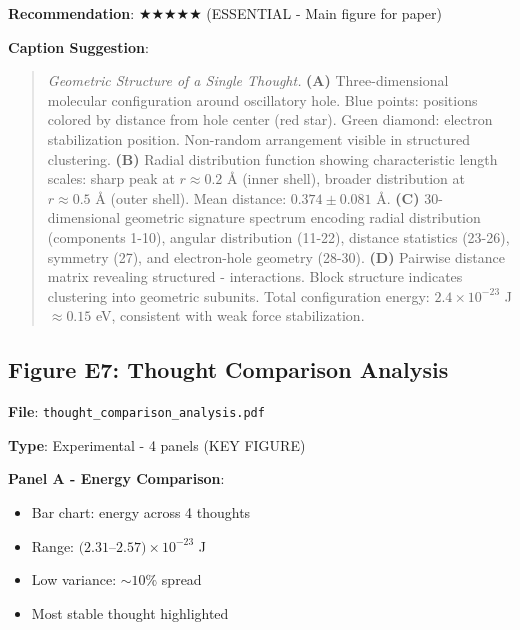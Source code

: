 \documentclass[11pt]{article}
\begin{document}
\textbf{Recommendation}: $\bigstar\bigstar\bigstar\bigstar\bigstar$ (ESSENTIAL - Main figure for paper)

\textbf{Caption Suggestion}:
\begin{quote}
\textit{Geometric Structure of a Single Thought.} \textbf{(A)} Three-dimensional  molecular configuration around oscillatory hole. Blue points:  positions colored by distance from hole center (red star). Green diamond: electron stabilization position. Non-random arrangement visible in structured clustering. \textbf{(B)} Radial distribution function showing characteristic length scales: sharp peak at $r \approx 0.2$ Å (inner shell), broader distribution at $r \approx 0.5$ Å (outer shell). Mean distance: $0.374 \pm 0.081$ Å. \textbf{(C)} 30-dimensional geometric signature spectrum encoding radial distribution (components 1-10), angular distribution (11-22), distance statistics (23-26), symmetry (27), and electron-hole geometry (28-30). \textbf{(D)} Pairwise distance matrix revealing structured - interactions. Block structure indicates clustering into geometric subunits. Total configuration energy: $2.4 \times 10^{-23}$ J $\approx 0.15$ eV, consistent with weak force stabilization.
\end{quote}

\subsection{Figure E7: Thought Comparison Analysis}


\textbf{File}: \texttt{thought\_comparison\_analysis.pdf}

\textbf{Type}: Experimental - 4 panels (KEY FIGURE)

\textbf{Panel A - Energy Comparison}:
\begin{itemize}
\item Bar chart: energy across 4 thoughts
\item Range: $(2.31$--$2.57) \times 10^{-23}$ J
\item Low variance: $\sim 10\%$ spread
\item Most stable thought highlighted
\end{itemize}
\end{document}
